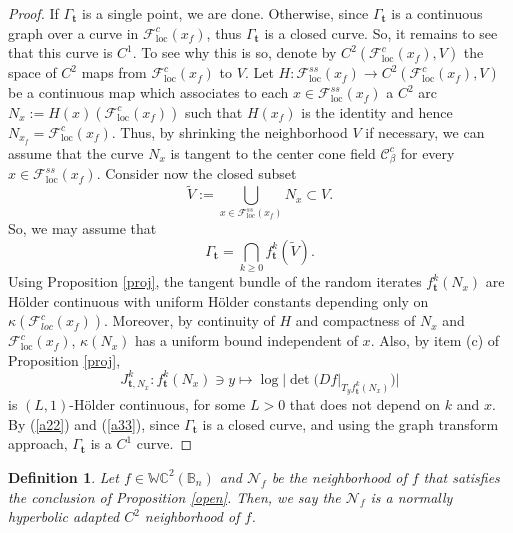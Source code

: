 \documentclass[11pt,reqno]{amsart}
\theoremstyle{plain}
\newtheorem{definition}[theorem]{Definition}
\newtheorem*{theorem A}{Theorem A}
\newtheorem*{theorem B}{Theorem B}
\newtheorem*{theorem C}{Theorem C}
\newtheorem*{theorem 1}{Theorem 1}
\newtheorem*{theorem 2}{Theorem 2}
\newtheorem*{theorem 3}{Theorem 3}
\numberwithin{equation}{section}
\begin{document}
\begin{proof}
If $\Gamma_{\mathbf{t}}$ is a single point, we are done.
Otherwise, since $\Gamma_{\mathbf{t}}$ is a continuous graph over a curve in $\mathcal{F}^{c}_{\mathrm{loc}}(x_f)$, thus $\Gamma_{\mathbf{t}}$ is a closed curve.
So, it remains to see that this curve is $C^1$.
To see why this is so, denote by $C^2(\mathcal{F}^c_{\mathrm{loc}}(x_f), V)$ the space of $C^2$ maps from $\mathcal{F}^c_{\mathrm{loc}}(x_f)$ to $V$.
Let $H \colon \mathcal{F}^{ss}_{\mathrm{loc}} (x_f)\to C^2(\mathcal{F}^c_{\mathrm{loc}} (x_f), V)$ be a continuous map which associates to each $x \in \mathcal{F}^{ss}_{\mathrm{loc}}(x_f)$ a $C^2$ arc $N_x := H(x)(\mathcal{F}^c_{\mathrm{loc}}(x_f))$ such that $H(x_f)$ is the identity and hence $N_{x_f} = \mathcal{F}^c_{\mathrm{loc}}(x_f)$.
Thus, by shrinking the neighborhood $V$ if necessary, we can assume that the curve $N_x$ is tangent to the center cone field $\mathcal{C}^c_{\beta}$ for every $x \in \mathcal{F}^{ss}_{\mathrm{loc}}(x_f)$.
Consider now the closed subset
\begin{equation}\label{a11}
\widetilde{V}:=\bigcup_{x \in \mathcal{F}^{ss}_{\mathrm{loc}}(x_f)}N_x \subset V.
\end{equation}
So, we may assume that
\begin{equation}\label{a22}
\Gamma_{\mathbf{t}}= \bigcap_{k\ge 0}f^k_{\mathbf{t}}(\widetilde{V}).
\end{equation}
Using Proposition \ref{proj}, the tangent bundle of the random iterates $f_{\textbf{t}}^k(N_x)$ are H\"{o}lder continuous with uniform H\"older constants depending only on $\kappa(\mathcal{F}^c_{loc}(x_f))$.
Moreover, by continuity of $H$ and compactness of $N_x$ and $\mathcal{F}^c_{\mathrm{loc}}(x_f)$, $\kappa(N_x)$ has a uniform bound independent of $x$.
Also, by item (c) of Proposition \ref{proj},
\begin{equation}\label{a33}
J^k_{\textbf{t},N_x} \colon f_{\textbf{t}}^k(N_x) \ni y \mapsto \log |\det(Df|_{T_yf_{\textbf{t}}^k(N_x)})|
\end{equation}
is $(L, 1)$-H\"{o}lder continuous, for some $L > 0$ that does not depend on $k$ and $x$.
By (\ref{a22}) and (\ref{a33}), since $\Gamma_{\mathbf{t}}$ is a closed curve, and using the graph transform approach, $\Gamma_{\mathbf{t}}$ is a $C^1$ curve.
\end{proof}



\begin{definition}\label{nhyper}
Let $f\in\mathbb{WC}^2 ( \mathbb{B}_n)$ and $\mathcal{N}_f$ be the neighborhood of $f$ that satisfies the conclusion of Proposition \ref{open}.
Then, we say the $\mathcal{N}_f$ is a normally hyperbolic adapted $C^2$ neighborhood of $f$.
\end{definition}
\end{document}
